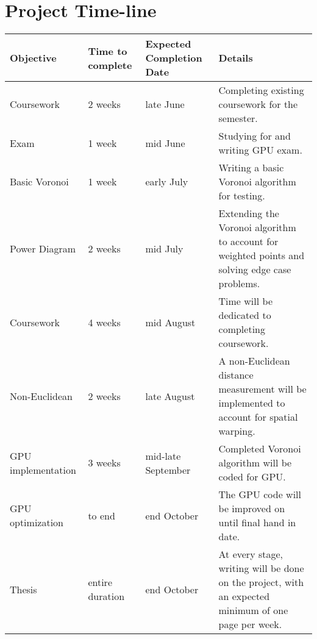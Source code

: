 \section{Project Time-line}

\begin{center}
 \begin{tabular}{|| m{9em} | m{5em}| m{8em} | m{22em} || } 
 \hline
 Objective 	& Time to complete 	& Expected Completion Date 	& Details \\
 \hline\hline
 Coursework	& 2 weeks		& late June			& Completing existing coursework for the semester. \\
 \hline
 Exam		& 1 week		& mid June			& Studying for and writing GPU exam. \\
 \hline
 Basic Voronoi 	& 1 week		& early July			& Writing a basic Voronoi algorithm for testing. \\ 
 \hline
 Power Diagram	& 2 weeks		& mid July			& Extending the Voronoi algorithm to account for weighted points and solving edge case problems. \\
 \hline
 Coursework 	& 4 weeks		& mid August			& Time will be dedicated to completing coursework. \\
 \hline
 Non-Euclidean	& 2 weeks		& late August 			& A non-Euclidean distance measurement will be implemented to account for spatial warping. \\
 \hline
 GPU implementation 	& 3 weeks	& mid-late September		& Completed Voronoi algorithm will be coded for GPU. \\ 
 \hline
 GPU optimization 	& to end	& end October			& The GPU code will be improved on until final hand in date. \\
 \hline
 Thesis		& entire duration	& end October			& At every stage, writing will be done on the project, with an expected minimum of one page per week. \\
 \hline
\end{tabular}
\end{center}

